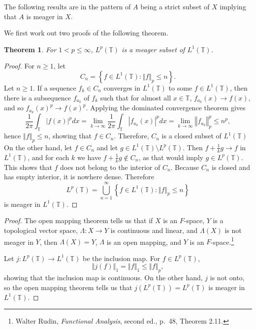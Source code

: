 \documentclass{article}
\newcommand{\norm}[1]{\left\Vert #1 \right\Vert}
\newtheorem{theorem}{Theorem}
\theoremstyle{definition}
\begin{document}
The following results are in the pattern of $A$ being a strict subset of $X$ implying
that $A$ is meager in $X$.

We first work out two proofs of the following theorem.

\begin{theorem}
For $1 < p \leq \infty$, $L^p(\mathbb{T})$ is a meager subset of $L^1(\mathbb{T})$.
\end{theorem}
\begin{proof}
For $n \geq 1$, let
\[
C_n = \left\{f \in L^1(\mathbb{T}): \norm{f}_p \leq n \right\}.
\]
Let $n \geq 1$. If a sequence $f_k \in C_n$ converges in $L^1(\mathbb{T})$ to some
$f \in L^1(\mathbb{T})$, 
then there is a subsequence
$f_{a_k}$ of $f_k$
such that for almost all $x \in \mathbb{T}$,
$f_{a_k}(x) \to f(x)$, and so $f_{a_k}(x)^p \to f(x)^p$.
Applying the dominated convergence theorem gives
\[
\frac{1}{2\pi} \int_{\mathbb{T}} |f(x)|^p dx 
= \lim_{k \to \infty} \frac{1}{2\pi} \int_{\mathbb{T}} |f_{a_k}(x)|^p dx
=\lim_{k \to \infty} \norm{f_{a_k}}_p^p
\leq n^p,
\]
hence $\norm{f}_p \leq n$, showing that $f \in C_n$. Therefore, $C_n$ is a closed subset of $L^1(\mathbb{T})$
On the other hand,
let $f \in C_n$ and
 let $g \in L^1(\mathbb{T}) \setminus L^p(\mathbb{T})$. 
Then $f+\frac{1}{k}g \to f$ in $L^1(\mathbb{T})$, and for each $k$ we have
$f+\frac{1}{k}g \not \in C_n$, as that would imply 
$g \in L^p(\mathbb{T})$.
This shows that $f$ does not belong to the interior of $C_n$. 
Because $C_n$ is closed and has empty interior, it is nowhere dense. 
Therefore
\[
L^p(\mathbb{T}) = \bigcup_{n=1}^\infty  \left\{f \in L^1(\mathbb{T}): \norm{f}_p \leq n \right\}
\]
is meager in $L^1(\mathbb{T})$.
\end{proof}


\begin{proof}
The open mapping theorem
tells us that if $X$ is an $F$-space, $Y$ is a topological vector space,
$\Lambda:X \to Y$ is continuous and linear, and $\Lambda(X)$ is not meager
in $Y$, then $\Lambda(X)=Y$, $\Lambda$ is an open mapping, and $Y$ is an $F$-space.\footnote{Walter Rudin,
{\em Functional Analysis}, second ed., p.~48, Theorem 2.11.}

Let $j:L^p(\mathbb{T}) \to L^1(\mathbb{T})$ be the inclusion map.
For $f \in L^p(\mathbb{T})$,
\[
\norm{j(f)}_1  = \norm{f}_1 \leq \norm{f}_p,
\]
showing that the inclusion map is continuous. On the other hand, 
$j$ is not onto, so the open mapping theorem tells us that $j(L^p(\mathbb{T}))=L^p(\mathbb{T})$ is meager in $L^1(\mathbb{T})$.
\end{proof}
\end{document}
